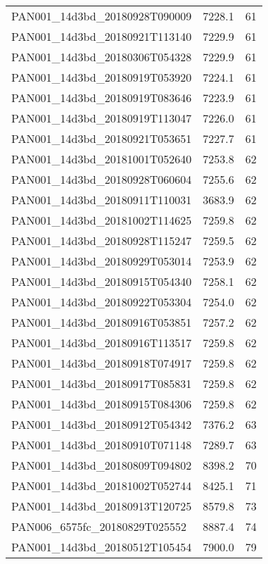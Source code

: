 \begin{tabular}{lrr}
PAN001\_14d3bd\_20180928T090009 &     7228.1 &       61 \\
PAN001\_14d3bd\_20180921T113140 &     7229.9 &       61 \\
PAN001\_14d3bd\_20180306T054328 &     7229.9 &       61 \\
PAN001\_14d3bd\_20180919T053920 &     7224.1 &       61 \\
PAN001\_14d3bd\_20180919T083646 &     7223.9 &       61 \\
PAN001\_14d3bd\_20180919T113047 &     7226.0 &       61 \\
PAN001\_14d3bd\_20180921T053651 &     7227.7 &       61 \\
PAN001\_14d3bd\_20181001T052640 &     7253.8 &       62 \\
PAN001\_14d3bd\_20180928T060604 &     7255.6 &       62 \\
PAN001\_14d3bd\_20180911T110031 &     3683.9 &       62 \\
PAN001\_14d3bd\_20181002T114625 &     7259.8 &       62 \\
PAN001\_14d3bd\_20180928T115247 &     7259.5 &       62 \\
PAN001\_14d3bd\_20180929T053014 &     7253.9 &       62 \\
PAN001\_14d3bd\_20180915T054340 &     7258.1 &       62 \\
PAN001\_14d3bd\_20180922T053304 &     7254.0 &       62 \\
PAN001\_14d3bd\_20180916T053851 &     7257.2 &       62 \\
PAN001\_14d3bd\_20180916T113517 &     7259.8 &       62 \\
PAN001\_14d3bd\_20180918T074917 &     7259.8 &       62 \\
PAN001\_14d3bd\_20180917T085831 &     7259.8 &       62 \\
PAN001\_14d3bd\_20180915T084306 &     7259.8 &       62 \\
PAN001\_14d3bd\_20180912T054342 &     7376.2 &       63 \\
PAN001\_14d3bd\_20180910T071148 &     7289.7 &       63 \\
PAN001\_14d3bd\_20180809T094802 &     8398.2 &       70 \\
PAN001\_14d3bd\_20181002T052744 &     8425.1 &       71 \\
PAN001\_14d3bd\_20180913T120725 &     8579.8 &       73 \\
PAN006\_6575fc\_20180829T025552 &     8887.4 &       74 \\
PAN001\_14d3bd\_20180512T105454 &     7900.0 &       79 \\

\end{tabular}
